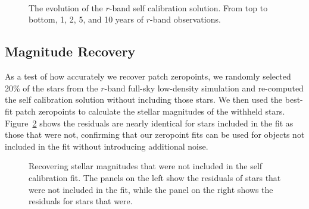 \documentclass[12pt,preprint]{aastex}
\begin{document}
\begin{figure}
 \\
 \\
 \\
\caption{The evolution of the $r$-band self calibration solution.  From top to bottom, 1, 2, 5, and 10 years of $r$-band observations.   \label{fig:timeevo}}
\end{figure}




\subsection{Magnitude Recovery}

As a test of how accurately we recover patch zeropoints, we randomly selected 20\% of the stars from the $r$-band full-sky low-density simulation and re-computed the self calibration solution without including those stars.  We then used the best-fit patch zeropoints to calculate the stellar magnitudes of the withheld stars.  Figure~\ref{fig:zpcheck} shows the residuals are nearly identical for stars included in the fit as those that were not, confirming that our zeropoint fits can be used for objects not included in the fit without introducing additional noise.


\begin{figure}
\caption{Recovering stellar magnitudes that were not included in the self calibration fit.  The panels on the left show the residuals of stars that were not included in the fit, while the panel on the right shows the residuals for stars that were.  \label{fig:zpcheck}}
\end{figure}
\end{document}
